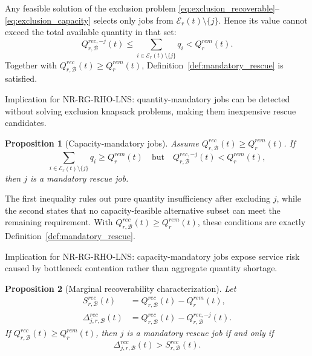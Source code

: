 \documentclass[a4paper,fleqn]{cas-sc}
\newtheorem{proposition}{Proposition}
\begin{document}
\begin{pf}
Any feasible solution of the exclusion problem \eqref{eq:exclusion_recoverable}--\eqref{eq:exclusion_capacity} selects only jobs from \(\mathcal E_r(t)\setminus\{j\}\). Hence its value cannot exceed the total available quantity in that set:
\[
Q_{r,\mathcal B}^{rec,-j}(t)
\le
\sum_{i\in\mathcal E_r(t)\setminus\{j\}}q_i
<
Q_r^{rem}(t).
\]
Together with \(Q_{r,\mathcal B}^{rec}(t)\ge Q_r^{rem}(t)\), Definition~\ref{def:mandatory_rescue} is satisfied.
\end{pf}

Implication for NR-RG-RHO-LNS: quantity-mandatory jobs can be detected without solving exclusion knapsack problems, making them inexpensive rescue candidates.

\begin{proposition}[Capacity-mandatory jobs]
\label{prop:capacity_mandatory}
Assume \(Q_{r,\mathcal B}^{rec}(t)\ge Q_r^{rem}(t)\). If
\begin{equation}
\sum_{i\in\mathcal E_r(t)\setminus\{j\}}q_i
\ge
Q_r^{rem}(t)
\quad\text{but}\quad
Q_{r,\mathcal B}^{rec,-j}(t)<Q_r^{rem}(t),
\label{eq:capacity_mandatory_cond}
\end{equation}
then \(j\) is a mandatory rescue job.
\end{proposition}

\begin{pf}
The first inequality rules out pure quantity insufficiency after excluding \(j\), while the second states that no capacity-feasible alternative subset can meet the remaining requirement. With \(Q_{r,\mathcal B}^{rec}(t)\ge Q_r^{rem}(t)\), these conditions are exactly Definition~\ref{def:mandatory_rescue}.
\end{pf}

Implication for NR-RG-RHO-LNS: capacity-mandatory jobs expose service risk caused by bottleneck contention rather than aggregate quantity shortage.

\begin{proposition}[Marginal recoverability characterization]
\label{prop:marginal_recoverability}
Let
\begin{align}
S_{r,\mathcal B}^{rec}(t)
&=
Q_{r,\mathcal B}^{rec}(t)-Q_r^{rem}(t),
\label{eq:surplus}\\
\Delta_{j,r,\mathcal B}^{rec}(t)
&=
Q_{r,\mathcal B}^{rec}(t)-Q_{r,\mathcal B}^{rec,-j}(t).
\label{eq:marginal}
\end{align}
If \(Q_{r,\mathcal B}^{rec}(t)\ge Q_r^{rem}(t)\), then \(j\) is a mandatory rescue job if and only if
\begin{equation}
\Delta_{j,r,\mathcal B}^{rec}(t)>S_{r,\mathcal B}^{rec}(t).
\label{eq:marginal_condition}
\end{equation}
\end{proposition}
\end{document}
